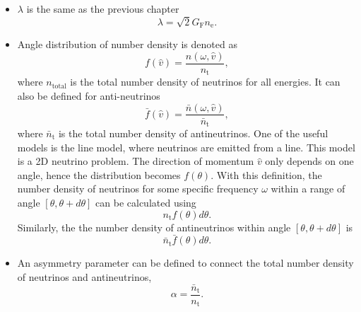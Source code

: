 \begin{itemize}
    \item $\lambda$ is the same as the previous chapter
    \begin{equation}
        \lambda = \sqrt{2} G_{\mathrm F} n_{\mathrm e}.
    \end{equation}
\item Angle distribution of number density is denoted as
\begin{equation}
    f(\hat v) = \frac{n(\omega,\hat v)}{n_{\mathrm{t}}},
\end{equation}
   where $n_{\mathrm{total}}$ is the total number density of neutrinos for all energies. It can also be defined for anti-neutrinos
\begin{equation}
      \bar f(\hat v) = \frac{\bar n(\omega,\hat v)}{\bar n_{\mathrm{t}}},
\end{equation}
where $\bar n_{\mathrm{t}}$ is the total number density of antineutrinos. One of the useful models is the line model, where neutrinos are emitted from a line. This model is a 2D neutrino problem. The direction of momentum $\hat v$ only depends on one angle, hence the distribution becomes $f(\theta)$. With this definition, the number density of neutrinos for some specific frequency $\omega$ within a range of angle $[\theta, \theta + d\theta]$ can be calculated using
\begin{equation}
      n_{\mathrm{t}} f(\theta) d\theta.
\end{equation}
Similarly, the the number density of antineutrinos within angle $[\theta,\theta+d\theta]$ is
\begin{equation}
    \bar n_{\mathrm{t}} \bar f(\theta) d\theta.
\end{equation}
\item An asymmetry parameter can be defined to connect the total number density of neutrinos and antineutrinos,
\begin{equation}
    \alpha = \frac{\bar n_{\mathrm{t}} }{n_{\mathrm{t}}}.
\end{equation}

\end{itemize}

